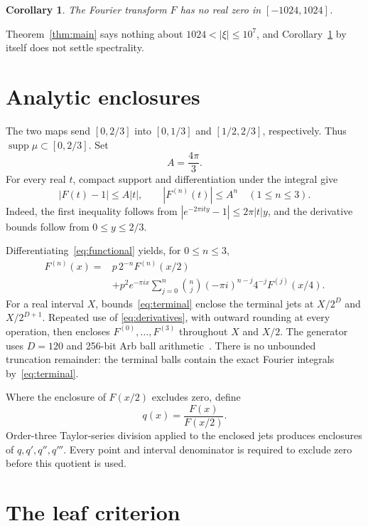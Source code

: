 \documentclass[11pt]{article}
\newtheorem{corollary}[theorem]{Corollary}
\begin{document}
\begin{corollary}\label{cor:combined}
The Fourier transform $F$ has no real zero in $[-1024,1024]$.
\end{corollary}

Theorem~\ref{thm:main} says nothing about
$1024<|\xi|\leq10^7$, and Corollary~\ref{cor:combined} by itself does not
settle spectrality.

\section{Analytic enclosures}

The two maps send $[0,2/3]$ into $[0,1/3]$ and $[1/2,2/3]$,
respectively.  Thus $\operatorname{supp}\mu\subset[0,2/3]$.  Set
\[
                    A=\frac{4\pi}{3}.
\]
For every real $t$, compact support and differentiation under the integral
give
\begin{equation}\label{eq:terminal}
 |F(t)-1|\leq A|t|,
 \qquad |F^{(n)}(t)|\leq A^n\quad (1\leq n\leq3).
\end{equation}
Indeed, the first inequality follows from
$|e^{-2\pi ity}-1|\leq2\pi|t|y$, and the derivative bounds follow from
$0\leq y\leq2/3$.

Differentiating~\eqref{eq:functional} yields, for $0\leq n\leq3$,
\begin{equation}\label{eq:derivatives}
\begin{split}
F^{(n)}(x)={}&p\,2^{-n}F^{(n)}(x/2)\\
&+p^2e^{-\pi ix}\sum_{j=0}^{n}\binom{n}{j}
       (-\pi i)^{n-j}4^{-j}F^{(j)}(x/4).
\end{split}
\end{equation}
For a real interval $X$, bounds~\eqref{eq:terminal} enclose the terminal
jets at $X/2^D$ and $X/2^{D+1}$.  Repeated use of
\eqref{eq:derivatives}, with outward rounding at every operation, then
encloses $F^{(0)},\ldots,F^{(3)}$ throughout $X$ and $X/2$.  The generator
uses $D=120$ and 256-bit Arb ball arithmetic~\cite{Johansson2017Arb}.
There is no unbounded truncation remainder: the terminal balls contain the
exact Fourier integrals by~\eqref{eq:terminal}.

Where the enclosure of $F(x/2)$ excludes zero, define
\[
                       q(x)=\frac{F(x)}{F(x/2)}.
\]
Order-three Taylor-series division applied to the enclosed jets produces
enclosures of $q,q',q'',q'''$.  Every point and interval denominator is
required to exclude zero before this quotient is used.

\section{The leaf criterion}
\end{document}
